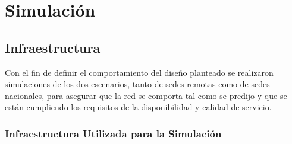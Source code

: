 \chapter{Simulación}
\label{cha:Simulación}

\section{Infraestructura} %
\label{sec:Infraestructura}


Con el fin de definir el comportamiento del diseño planteado se realizaron simulaciones de los dos escenarios, tanto de sedes remotas como de sedes nacionales, para asegurar que la red se comporta tal como se predijo y que se están cumpliendo los requisitos de la disponibilidad y calidad de servicio.

\subsection{Infraestructura Utilizada para la Simulación} %
\label{sec:Infraestructura Utilizada para la Simulación}

